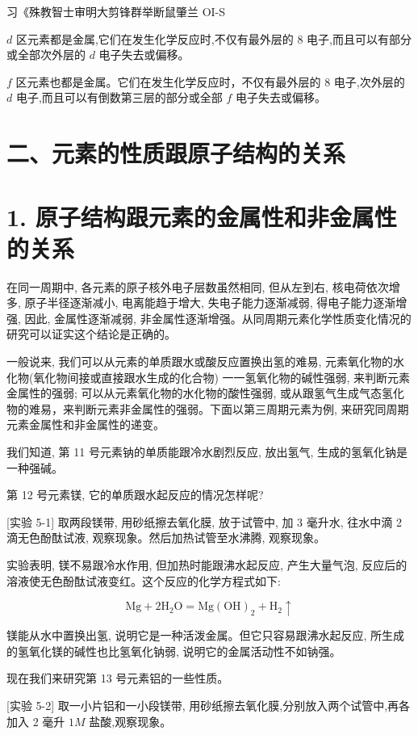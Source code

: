 \documentclass[10pt]{article}
\begin{document}
习《殊教智士审明大剪锋群举断鼠肇兰 OI-S

\(d\) 区元素都是金属,它们在发生化学反应时,不仅有最外层的 8 电子,而且可以有部分或全部次外层的 \(d\) 电子失去或偏移。

\(f\) 区元素也都是金属。它们在发生化学反应时，不仅有最外层的 8 电子,次外层的 \(d\) 电子,而且可以有倒数第三层的部分或全部 \(f\) 电子失去或偏移。

\section*{二、元素的性质跟原子结构的关系}

\section*{1. 原子结构跟元素的金属性和非金属性的关系}

在同一周期中, 各元素的原子核外电子层数虽然相同, 但从左到右, 核电荷依次增多, 原子半径逐渐减小, 电离能趋于增大, 失电子能力逐渐减弱, 得电子能力逐渐增强, 因此, 金属性逐渐减弱, 非金属性逐渐增强。从同周期元素化学性质变化情况的研究可以证实这个结论是正确的。

一般说来, 我们可以从元素的单质跟水或酸反应置换出氢的难易, 元素氧化物的水化物(氧化物间接或直接跟水生成的化合物) 一一氢氧化物的碱性强弱, 来判断元素金属性的强弱; 可以从元素氧化物的水化物的酸性强弱, 或从跟氢气生成气态氢化物的难易，来判断元素非金属性的强弱。下面以第三周期元素为例, 来研究同周期元素金属性和非金属性的递变。

我们知道, 第 11 号元素钠的单质能跟冷水剧烈反应, 放出氢气, 生成的氢氧化钠是一种强碱。

第 12 号元素镁, 它的单质跟水起反应的情况怎样呢?

[实验 5-1] 取两段镁带, 用砂纸擦去氧化膜, 放于试管中, 加 3 毫升水, 往水中滴 2 滴无色酚酞试液, 观察现象。然后加热试管至水沸腾, 观察现象。

实验表明, 镁不易跟冷水作用, 但加热时能跟沸水起反应, 产生大量气泡, 反应后的溶液使无色酚酞试液变红。这个反应的化学方程式如下:

\[
\mathrm{{Mg}} + 2{\mathrm{H}}_{2}\mathrm{O} = \mathrm{{Mg}}{\left( \mathrm{{OH}}\right) }_{2} + {\mathrm{H}}_{2} \uparrow
\]

镁能从水中置换出氢, 说明它是一种活泼金属。但它只容易跟沸水起反应, 所生成的氢氧化镁的碱性也比氢氧化钠弱, 说明它的金属活动性不如钠强。

现在我们来研究第 13 号元素铝的一些性质。

[实验 5-2] 取一小片铝和一小段镁带, 用砂纸擦去氧化膜,分别放入两个试管中,再各加入 2 毫升 \({1M}\) 盐酸,观察现象。
\end{document}
